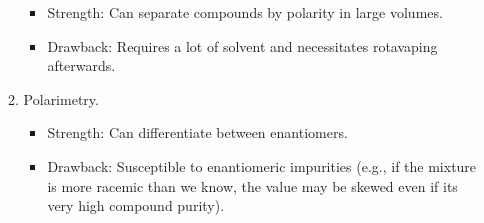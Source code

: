\documentclass[titlepage]{article}
\begin{document}
\begin{enumerate}
\begin{enumerate}
        \begin{itemize}
            \item Strength: Can separate compounds by polarity in large volumes.
            \item Drawback: Requires a lot of solvent and necessitates rotavaping afterwards.
        \end{itemize}
        \item Polarimetry.
        \begin{itemize}
            \item Strength: Can differentiate between enantiomers.
            \item Drawback: Susceptible to enantiomeric impurities (e.g., if the mixture is more racemic than we know, the value may be skewed even if its very high compound purity).
        \end{itemize}
    \end{enumerate}  
\end{enumerate}
\newpage



\printbibliography
\end{document}
